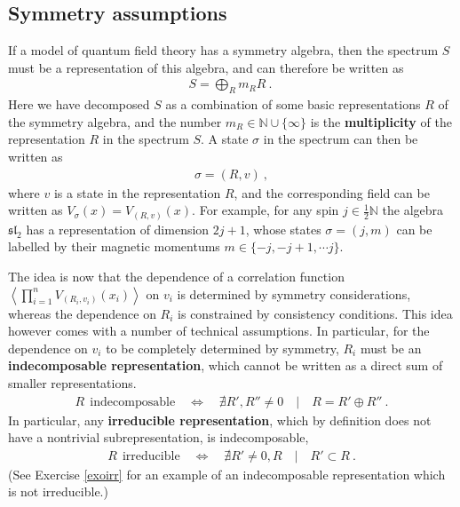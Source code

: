 \documentclass[12pt, a4paper, notitlepage, twoside]{report}
\numberwithin{equation}{section}
\theoremstyle{break}
\begin{document}
\subsection{Symmetry assumptions \label{secsa}}

If a model of quantum field theory has a symmetry algebra, then the spectrum $S$ must be a representation of this algebra, and can therefore be written as
\begin{align}
 S = \bigoplus_R m_R  R\ .\
\label{somr}
\end{align}
Here we have decomposed $S$ as a combination of some basic representations $R$ of the symmetry algebra, and the number $m_R \in {\mathbb{N}}\cup\{\infty\}$ is the \textbf{\boldmath multiplicity} of the representation $R$ in the spectrum $S$.
A state $\sigma$ in the spectrum can then be written as 
\begin{align}
 \sigma = (R,v)\ ,
\label{arv}
\end{align}
where $v$ is a state in the representation $R$, and the corresponding field can be written as 
$V_\sigma(x)= V_{(R,v)}(x)$. For example, for any spin $j\in \frac12 \mathbb{N}$ the algebra $\mathfrak{sl}_2$ has a representation of dimension $2j+1$, whose states $\sigma = (j,m)$ can be labelled by their magnetic momentums $m\in\{-j, -j+1,\cdots j\}$.

The idea is now that the dependence of a correlation function $\left\langle \prod_{i=1}^n V_{(R_i,v_i)}(x_i)\right\rangle$ on $v_i$ is determined by symmetry considerations, whereas the dependence on $R_i$ is constrained by consistency conditions.
This idea however comes with a number of technical assumptions.
In particular, for the dependence on $v_i$ to be completely determined by symmetry, $R_i$ must be an \textbf{\boldmath indecomposable representation}, which cannot be written as a direct sum of smaller representations.
\begin{align}
 R \ \ \text{indecomposable} \quad \Leftrightarrow \quad \nexists R',R'' \neq 0 \quad | \quad R = R'\oplus R''\ .
\end{align}
In particular, any \textbf{\boldmath irreducible representation}, which by definition does not have a nontrivial subrepresentation, is indecomposable,
\begin{align}
 R \ \ \text{irreducible} \quad \Leftrightarrow \quad \nexists R' \neq 0,R \quad | \quad R'\subset R\ .
\end{align}
(See Exercise \ref{exoirr} for an example of an indecomposable representation which is not irreducible.)
\end{document}
